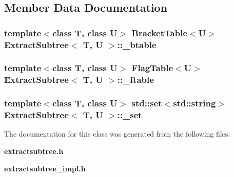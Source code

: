 \subsection{Member Data Documentation}
\subsubsection{\setlength{\rightskip}{0pt plus 5cm}template$<$class T, class U$>$ {\bf Bracket\-Table}$<$U$>$ {\bf Extract\-Subtree}$<$ T, U $>$::{\bf \_\-btable}\hspace{0.3cm}{\tt  [protected]}}\label{classExtractSubtree_p0}


\subsubsection{\setlength{\rightskip}{0pt plus 5cm}template$<$class T, class U$>$ {\bf Flag\-Table}$<$U$>$ {\bf Extract\-Subtree}$<$ T, U $>$::{\bf \_\-ftable}\hspace{0.3cm}{\tt  [protected]}}\label{classExtractSubtree_p1}


\subsubsection{\setlength{\rightskip}{0pt plus 5cm}template$<$class T, class U$>$ std::set$<$std::string$>$ {\bf Extract\-Subtree}$<$ T, U $>$::{\bf \_\-set}\hspace{0.3cm}{\tt  [protected]}}\label{classExtractSubtree_p2}




The documentation for this class was generated from the following files:\begin{CompactItemize}
\item 
{\bf extractsubtree.h}\item 
{\bf extractsubtree\_\-impl.h}\end{CompactItemize}
